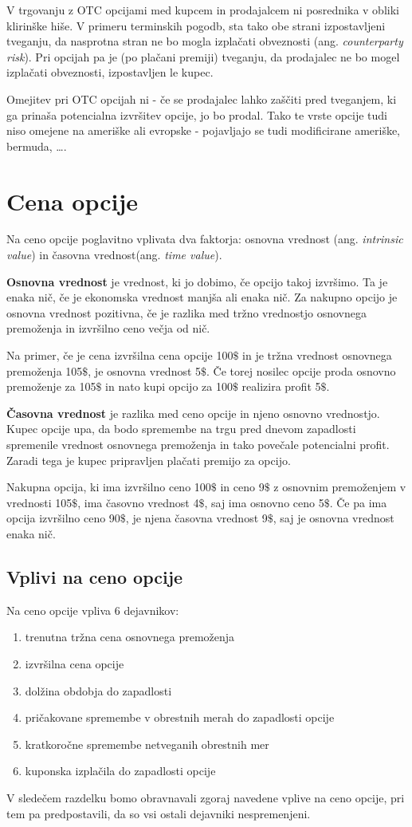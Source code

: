 \documentclass[a4paper]{article}
\begin{document}
V trgovanju z OTC opcijami med kupcem in prodajalcem ni posrednika v obliki klirinške hiše. V primeru terminskih pogodb, sta tako
obe strani izpostavljeni tveganju, da nasprotna stran ne bo mogla izplačati obveznosti (ang. \textit{counterparty risk}). Pri opcijah
pa je (po plačani premiji) tveganju, da prodajalec ne bo mogel izplačati obveznosti, izpostavljen le kupec.

Omejitev pri OTC opcijah ni - če se prodajalec lahko zaščiti pred tveganjem, ki ga prinaša potencialna izvršitev opcije, jo bo prodal.
Tako te vrste opcije tudi niso omejene na ameriške ali evropske - pojavljajo se tudi modificirane ameriške, bermuda, \ldots.

\section{Cena opcije}
Na ceno opcije poglavitno vplivata dva faktorja: osnovna vrednost (ang. \textit{intrinsic value}) in časovna vrednost(ang. \textit{time value}).

\textbf{Osnovna vrednost} je vrednost, ki jo dobimo, če opcijo takoj izvršimo. Ta je enaka nič, če je ekonomska vrednost manjša ali enaka nič.
Za nakupno opcijo je osnovna vrednost pozitivna, če je razlika med tržno vrednostjo osnovnega premoženja in izvršilno ceno večja od nič.

Na primer, če je cena izvršilna cena opcije 100$\$$ in je tržna vrednost osnovnega premoženja 105$\$$, je osnovna vrednost 5$\$$. 
Če torej nosilec opcije proda osnovno premoženje za 105$\$$ in nato kupi opcijo za 100$\$$ realizira profit 5$\$$.

\textbf{Časovna vrednost} je razlika med ceno opcije in njeno osnovno vrednostjo. Kupec opcije upa, da bodo spremembe na trgu pred
dnevom zapadlosti spremenile vrednost osnovnega premoženja in tako povečale potencialni profit. Zaradi tega je kupec pripravljen plačati
premijo za opcijo. 

Nakupna opcija, ki ima izvršilno ceno 100$\$$ in ceno 9$\$$ z osnovnim premoženjem v vrednosti 105$\$$, ima časovno vrednost 4$\$$,
saj ima osnovno ceno 5$\$$. Če pa ima opcija izvršilno ceno 90$\$$, je njena časovna vrednost 9$\$$, saj je osnovna vrednost enaka nič.

\subsection{Vplivi na ceno opcije}
Na ceno opcije vpliva 6 dejavnikov:
\begin{enumerate}
    \item trenutna tržna cena osnovnega premoženja
    \item izvršilna cena opcije
    \item dolžina obdobja do zapadlosti
    \item pričakovane spremembe v obrestnih merah do zapadlosti opcije
    \item kratkoročne spremembe netveganih obrestnih mer
    \item kuponska izplačila do zapadlosti opcije
\end{enumerate}
V sledečem razdelku bomo obravnavali zgoraj navedene vplive na ceno opcije, pri tem pa predpostavili, da so vsi ostali
dejavniki nespremenjeni.
\end{document}
